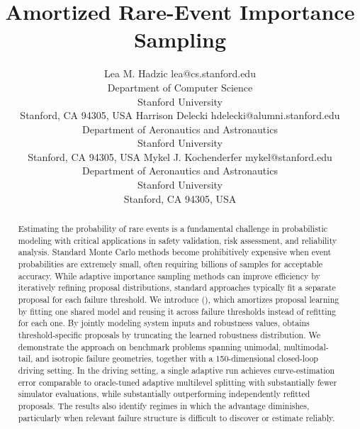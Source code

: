 \documentclass[twoside,11pt]{article}
\begin{document}
\title{Amortized Rare-Event Importance Sampling}

\author{\name Lea M. Hadzic \email lea@cs.stanford.edu \\
       \addr Department of Computer Science \\
       Stanford University\\
       Stanford, CA 94305, USA
       \AND
       \name Harrison Delecki \email hdelecki@alumni.stanford.edu \\
       \addr Department of Aeronautics and Astronautics\\
       Stanford University\\
       Stanford, CA 94305, USA
       \AND
       \name Mykel J. Kochenderfer \email mykel@stanford.edu \\
       \addr Department of Aeronautics and Astronautics\\
       Stanford University\\
       Stanford, CA 94305, USA
       }


\maketitle

\begin{abstract}%
Estimating the probability of rare events is a fundamental challenge in probabilistic modeling with critical applications in safety validation, risk assessment, and reliability analysis. Standard Monte Carlo methods become prohibitively expensive when event probabilities are extremely small, often requiring billions of samples for acceptable accuracy. While adaptive importance sampling methods can improve efficiency by iteratively refining proposal distributions, standard approaches typically fit a separate proposal for each failure threshold. We introduce \algfullname{} (\algname{}), which amortizes proposal learning by fitting one shared model and reusing it across failure thresholds instead of refitting for each one. By jointly modeling system inputs and robustness values, \algname{} obtains threshold-specific proposals by truncating the learned robustness distribution. We demonstrate the approach on benchmark problems spanning unimodal, multimodal-tail, and isotropic failure geometries, together with a 150-dimensional closed-loop driving setting. In the driving setting, a single adaptive run achieves curve-estimation error comparable to oracle-tuned adaptive multilevel splitting with substantially fewer simulator evaluations, while substantially outperforming independently refitted proposals. The results also identify regimes in which the advantage diminishes, particularly when relevant failure structure is difficult to discover or estimate reliably.
\end{abstract}
\end{document}
